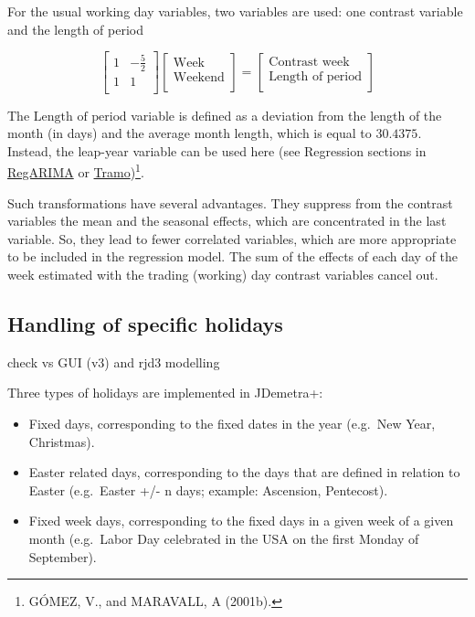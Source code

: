 \documentclass[
  letterpaper,
  DIV=11,
  numbers=noendperiod]{scrreprt}
\begin{document}
For the usual working day variables, two variables are used: one
contrast variable and the length of period

\[\begin{bmatrix}                  
  1 & - \frac{5}{2} \\              
  1 & 1 \\                          
  \end{bmatrix}\begin{bmatrix}      
  \text{Week} \\                    
  \text{Weekend} \\                 
  \end{bmatrix} = \begin{bmatrix}   
  \text{Contrast week} \\          
  \text{Length of period} \\      
  \end{bmatrix}\]

The \(\text{Length of period}\) variable is defined as a deviation from
the length of the month (in days) and the average month length, which is
equal to \(30.4375.\) Instead, the leap-year variable can be used here
(see Regression sections in \protect\hyperlink{regression}{RegARIMA} or
\protect\hyperlink{regression}{Tramo})\footnote{GÓMEZ, V., and MARAVALL,
  A (2001b).}.

Such transformations have several advantages. They suppress from the
contrast variables the mean and the seasonal effects, which are
concentrated in the last variable. So, they lead to fewer correlated
variables, which are more appropriate to be included in the regression
model. The sum of the effects of each day of the week estimated with the
trading (working) day contrast variables cancel out.

\hypertarget{handling-of-specific-holidays}{%
\subsection{Handling of specific
holidays}\label{handling-of-specific-holidays}}

check vs GUI (v3) and rjd3 modelling

Three types of holidays are implemented in JDemetra+:

\begin{itemize}
\item
  Fixed days, corresponding to the fixed dates in the year (e.g.~New
  Year, Christmas).
\item
  Easter related days, corresponding to the days that are defined in
  relation to Easter (e.g.~Easter +/- n days; example: Ascension,
  Pentecost).
\item
  Fixed week days, corresponding to the fixed days in a given week of a
  given month (e.g.~Labor Day celebrated in the USA on the first Monday
  of September).
\end{itemize}
\end{document}
